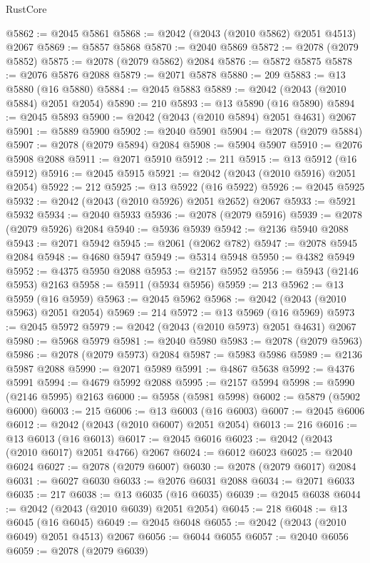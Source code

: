\begin{lexlean}{RustCore}
\begin{coremodule}
@5862 := @2045 @5861
@5868 := @2042 (@2043 (@2010 @5862) @2051 @4513) @2067
@5869 := @5857 @5868
@5870 := @2040 @5869
@5872 := @2078 (@2079 @5852)
@5875 := @2078 (@2079 @5862) @2084
@5876 := @5872 @5875
@5878 := @2076 @5876 @2088
@5879 := @2071 @5878
@5880 := 209
@5883 := @13 @5880 (@16 @5880)
@5884 := @2045 @5883
@5889 := @2042 (@2043 (@2010 @5884) @2051 @2054)
@5890 := 210
@5893 := @13 @5890 (@16 @5890)
@5894 := @2045 @5893
@5900 := @2042 (@2043 (@2010 @5894) @2051 @4631) @2067
@5901 := @5889 @5900
@5902 := @2040 @5901
@5904 := @2078 (@2079 @5884)
@5907 := @2078 (@2079 @5894) @2084
@5908 := @5904 @5907
@5910 := @2076 @5908 @2088
@5911 := @2071 @5910
@5912 := 211
@5915 := @13 @5912 (@16 @5912)
@5916 := @2045 @5915
@5921 := @2042 (@2043 (@2010 @5916) @2051 @2054)
@5922 := 212
@5925 := @13 @5922 (@16 @5922)
@5926 := @2045 @5925
@5932 := @2042 (@2043 (@2010 @5926) @2051 @2652) @2067
@5933 := @5921 @5932
@5934 := @2040 @5933
@5936 := @2078 (@2079 @5916)
@5939 := @2078 (@2079 @5926) @2084
@5940 := @5936 @5939
@5942 := @2136 @5940 @2088
@5943 := @2071 @5942
@5945 := @2061 (@2062 @782)
@5947 := @2078 @5945 @2084
@5948 := @4680 @5947
@5949 := @5314 @5948
@5950 := @4382 @5949
@5952 := @4375 @5950 @2088
@5953 := @2157 @5952
@5956 := @5943 (@2146 @5953) @2163
@5958 := @5911 (@5934 @5956)
@5959 := 213
@5962 := @13 @5959 (@16 @5959)
@5963 := @2045 @5962
@5968 := @2042 (@2043 (@2010 @5963) @2051 @2054)
@5969 := 214
@5972 := @13 @5969 (@16 @5969)
@5973 := @2045 @5972
@5979 := @2042 (@2043 (@2010 @5973) @2051 @4631) @2067
@5980 := @5968 @5979
@5981 := @2040 @5980
@5983 := @2078 (@2079 @5963)
@5986 := @2078 (@2079 @5973) @2084
@5987 := @5983 @5986
@5989 := @2136 @5987 @2088
@5990 := @2071 @5989
@5991 := @4867 @5638
@5992 := @4376 @5991
@5994 := @4679 @5992 @2088
@5995 := @2157 @5994
@5998 := @5990 (@2146 @5995) @2163
@6000 := @5958 (@5981 @5998)
@6002 := @5879 (@5902 @6000)
@6003 := 215
@6006 := @13 @6003 (@16 @6003)
@6007 := @2045 @6006
@6012 := @2042 (@2043 (@2010 @6007) @2051 @2054)
@6013 := 216
@6016 := @13 @6013 (@16 @6013)
@6017 := @2045 @6016
@6023 := @2042 (@2043 (@2010 @6017) @2051 @4766) @2067
@6024 := @6012 @6023
@6025 := @2040 @6024
@6027 := @2078 (@2079 @6007)
@6030 := @2078 (@2079 @6017) @2084
@6031 := @6027 @6030
@6033 := @2076 @6031 @2088
@6034 := @2071 @6033
@6035 := 217
@6038 := @13 @6035 (@16 @6035)
@6039 := @2045 @6038
@6044 := @2042 (@2043 (@2010 @6039) @2051 @2054)
@6045 := 218
@6048 := @13 @6045 (@16 @6045)
@6049 := @2045 @6048
@6055 := @2042 (@2043 (@2010 @6049) @2051 @4513) @2067
@6056 := @6044 @6055
@6057 := @2040 @6056
@6059 := @2078 (@2079 @6039)

\end{coremodule}
\end{lexlean}
